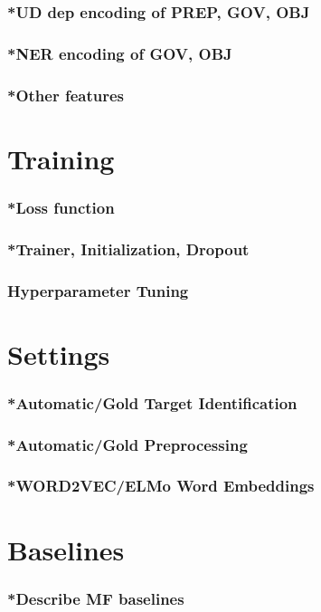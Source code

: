 \subsubsection{*UD dep encoding of PREP, GOV, OBJ}
\subsubsection{*NER encoding of GOV, OBJ}
\subsubsection{*Other features}

\section{Training}
\subsubsection{*Loss function}
\subsubsection{*Trainer, Initialization, Dropout}
\subsubsection{Hyperparameter Tuning}

\section{Settings}
\subsubsection{*Automatic/Gold Target Identification}
\subsubsection{*Automatic/Gold Preprocessing}
\subsubsection{*WORD2VEC/ELMo Word Embeddings}

\section{Baselines}
\subsubsection{*Describe MF baselines}

